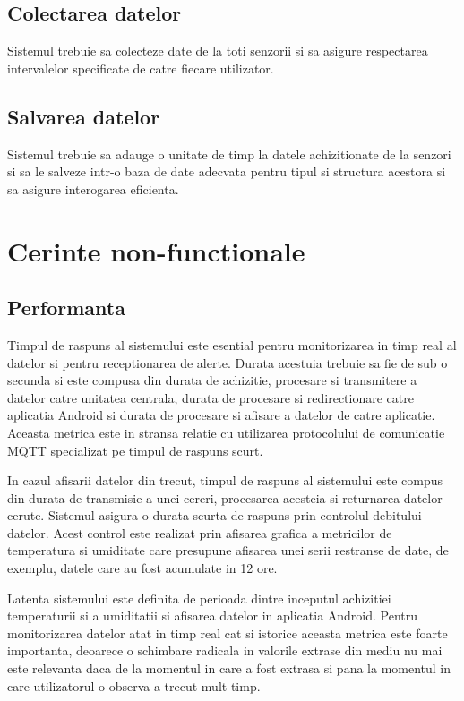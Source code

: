 \subsection{Colectarea datelor}\label{subsec:cnf_colectare}
Sistemul trebuie sa colecteze date de la toti senzorii si sa asigure respectarea intervalelor specificate de catre fiecare utilizator.

\subsection{Salvarea datelor}\label{subsec:cnf_salvare}
Sistemul trebuie sa adauge o unitate de timp la datele achizitionate de la senzori si sa le salveze intr-o baza de date adecvata pentru tipul si 
structura acestora si sa asigure interogarea eficienta.

\section{Cerinte non-functionale}\label{sec:cerinte_nonfunctionale}
\subsection{Performanta}\label{subsec:cnf_performanta}
Timpul de raspuns al sistemului este esential pentru monitorizarea in timp real al datelor si pentru receptionarea de alerte. Durata acestuia trebuie 
sa fie de sub o secunda si este compusa din durata de achizitie, procesare si transmitere a datelor catre unitatea centrala, durata de procesare si 
redirectionare catre aplicatia Android si durata de procesare si afisare a datelor de catre aplicatie. Aceasta metrica este in stransa relatie cu 
utilizarea protocolului de comunicatie MQTT specializat pe timpul de raspuns scurt. 

In cazul afisarii datelor din trecut, timpul de raspuns al sistemului este compus din durata de transmisie a unei cereri, procesarea acesteia si returnarea
datelor cerute. Sistemul asigura o durata scurta de raspuns prin controlul debitului datelor. Acest control este realizat prin afisarea grafica a metricilor
de temperatura si umiditate care presupune afisarea unei serii restranse de date, de exemplu, datele care au fost acumulate in 12 ore.

Latenta sistemului este definita de perioada dintre inceputul achizitiei temperaturii si a umiditatii si afisarea datelor in aplicatia Android. Pentru 
monitorizarea datelor atat in timp real cat si istorice aceasta metrica este foarte importanta, deoarece o schimbare radicala in valorile extrase din mediu 
nu mai este relevanta daca de la momentul in care a fost extrasa si pana la momentul in care utilizatorul o observa a trecut mult timp.

